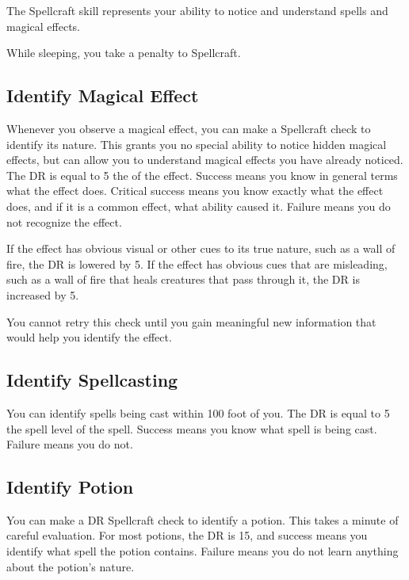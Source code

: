 \newpage
{}
        The Spellcraft skill represents your ability to notice and understand spells and magical effects.

        While sleeping, you take a  penalty to Spellcraft.


    \subsection{Identify Magical Effect}
        Whenever you observe a magical effect, you can make a Spellcraft check to identify its nature.
        This grants you no special ability to notice hidden magical effects, but can allow you to understand magical effects you have already noticed.
        The DR is equal to 5 \add the  of the effect.
        Success means you know in general terms what the effect does.
        Critical success means you know exactly what the effect does, and if it is a common effect, what ability caused it.
        Failure means you do not recognize the effect.

        If the effect has obvious visual or other cues to its true nature, such as a wall of fire, the DR is lowered by 5.
        If the effect has obvious cues that are misleading, such as a wall of fire that heals creatures that pass through it, the DR is increased by 5.

        You cannot retry this check until you gain meaningful new information that would help you identify the effect.

    \subsection{Identify Spellcasting}
        You can identify spells being cast within 100 foot  of you.
        The DR is equal to 5 \add the spell level of the spell.
        Success means you know what spell is being cast.
        Failure means you do not.

    \subsection{Identify Potion}
        You can make a DR Spellcraft check to identify a potion.
        This takes a minute of careful evaluation.
        For most potions, the DR is 15, and success means you identify what spell the potion contains.
        Failure means you do not learn anything about the potion's nature.

